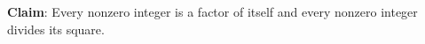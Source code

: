 
{\bf Claim}: Every nonzero integer is a factor of itself and 
every nonzero integer divides its square.

\vspace{100pt}
